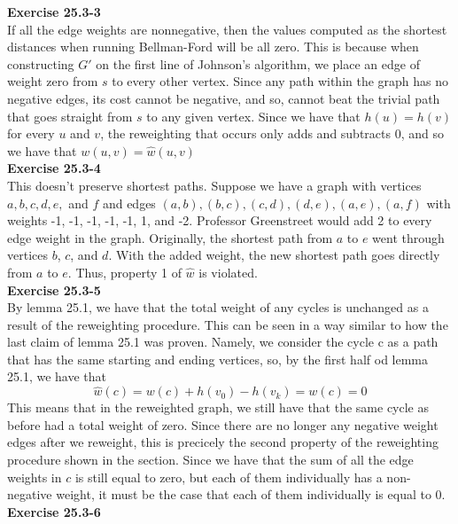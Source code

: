 \documentclass{article}
\begin{document}
\noindent\textbf{Exercise 25.3-3}\\

If all the edge weights are nonnegative, then the values computed as the shortest distances when running Bellman-Ford will be all zero. This is because when constructing $G'$ on the first line of Johnson's algorithm, we place an edge of weight zero from $s$ to every other vertex. Since any path within the graph has no negative edges, its cost cannot be negative, and so, cannot beat the trivial path that goes straight from $s$ to any given vertex. Since we have that $h(u) = h(v)$ for every $u$ and $v$, the reweighting that occurs only adds and subtracts 0, and so we have that $w(u,v) = \hat w(u,v)$\\

\noindent\textbf{Exercise 25.3-4}\\

This doesn't preserve shortest paths.  Suppose we have a graph with vertices $a, b, c, d, e,$ and $f$ and edges $(a,b), (b,c), (c,d), (d,e), (a,e), (a,f)$ with weights -1, -1, -1, -1, -1, 1, and -2.  Professor Greenstreet would add 2 to every edge weight in the graph.  Originally, the shortest path from $a$ to $e$ went through vertices $b$, $c$, and $d$.  With the added weight, the new shortest path goes directly from $a$ to $e$.  Thus, property 1 of $\hat{w}$ is violated.\\

\noindent\textbf{Exercise 25.3-5}\\

By lemma 25.1, we have that the total weight of any cycles is unchanged as a result of the reweighting procedure. This can be seen in a way similar to how the last claim of lemma 25.1 was proven. Namely, we consider the cycle c as a path that has the same starting and ending vertices, so, by the first half od lemma 25.1, we have that
\[
\hat w(c) = w(c) + h(v_0) -h(v_k) = w(c) = 0
 \]
This means that in the reweighted graph, we still have that the same cycle as before had a total weight of zero. Since there are no longer any negative weight edges after we reweight, this is precicely the second property of the reweighting procedure shown in the section. Since we have that the sum of all the edge weights in $c$ is still equal to zero, but each of them individually has a non-negative weight, it must be the case that each of them individually is equal to 0.\\

\noindent\textbf{Exercise 25.3-6}\\
\end{document}
